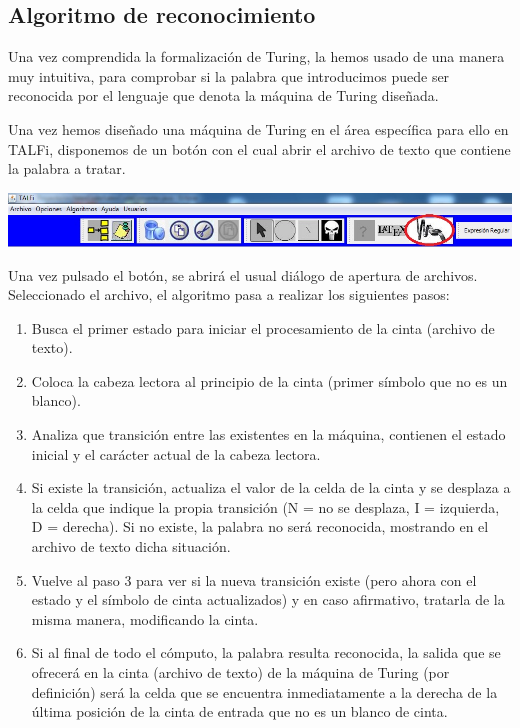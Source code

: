 \documentclass[12pt,a4paper,spanish]{book}
\begin{document}
\subsection{Algoritmo de reconocimiento}
\label{sec:tur}
Una vez comprendida la formalizaci\'on de Turing, la hemos usado de una manera muy intuitiva, para comprobar si la palabra que introducimos puede ser reconocida por el lenguaje que denota la m\'aquina de Turing dise\~nada.

Una vez hemos dise\~nado una m\'aquina de Turing en el \'area espec\'ifica para ello en TALFi, disponemos de un bot\'on con el cual abrir el archivo de texto que contiene la palabra a tratar.


\begin{center}
\includegraphics[width=\textwidth]{turi2.jpg}
\end{center}

Una vez pulsado el bot\'on, se abrir\'a el usual di\'alogo de apertura de archivos. Seleccionado el archivo, el algoritmo pasa a realizar los siguientes pasos:
\begin{enumerate}
\item Busca el primer estado para iniciar el procesamiento de la cinta (archivo de texto).
\item Coloca la cabeza lectora al principio de la cinta (primer s\'imbolo que no es un blanco).
\item Analiza que transici\'on entre las existentes en la m\'aquina, contienen el estado inicial y el car\'acter actual de la cabeza lectora.
\item Si existe la transici\'on, actualiza el valor de la celda de la cinta y se desplaza a la celda que indique la propia transici\'on (N =  no se desplaza, I = izquierda, D = derecha). Si no existe, la palabra no ser\'a reconocida, mostrando en el archivo de texto dicha situaci\'on.
\item Vuelve al paso 3 para ver si la nueva transici\'on existe (pero ahora con el estado y el s\'imbolo de cinta actualizados) y en caso afirmativo, tratarla de la misma manera, modificando la cinta.
\item Si al final de todo el c\'omputo, la palabra resulta reconocida, la salida que se ofrecer\'a en la cinta (archivo de texto) de la m\'aquina de Turing (por definici\'on) ser\'a la celda que se encuentra inmediatamente a la derecha de la \'ultima posici\'on de la cinta de entrada que no es un blanco de cinta.
\end{enumerate}
\end{document}
